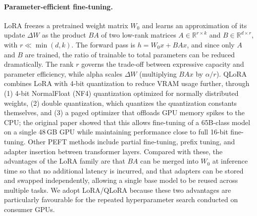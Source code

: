 \paragraph{Parameter-efficient fine-tuning.}
LoRA \citep{hu2022lora} freezes a pretrained weight matrix $W_0$ and learns an
approximation of its update $\Delta W$ as the product $BA$ of two low-rank
matrices $A \in \mathbb{R}^{r \times k}$ and $B \in \mathbb{R}^{d \times r}$, with
$r \ll \min(d,k)$. The forward pass is $h = W_0 x + BAx$, and since only $A$ and
$B$ are trained, the ratio of trainable to total parameters can be reduced
dramatically. The rank $r$ governs the trade-off between expressive capacity and
parameter efficiency, while alpha scales $\Delta W$ (multiplying $BAx$ by
$\alpha/r$). QLoRA \citep{dettmers2023qlora} combines LoRA with 4-bit
quantization to reduce VRAM usage further, through (1) 4-bit NormalFloat (NF4)
quantization optimized for normally distributed weights, (2) double quantization,
which quantizes the quantization constants themselves, and (3) a paged optimizer
that offloads GPU memory spikes to the CPU; the original paper showed that this
allows fine-tuning of a 65B-class model on a single 48\,GB GPU while maintaining
performance close to full 16-bit fine-tuning. Other PEFT methods include partial
fine-tuning, prefix tuning, and adapter insertion between transformer layers.
Compared with these, the advantages of the LoRA family are that $BA$ can be
merged into $W_0$ at inference time so that no additional latency is incurred,
and that adapters can be stored and swapped independently, allowing a single base
model to be reused across multiple tasks. We adopt LoRA/QLoRA because these two
advantages are particularly favourable for the repeated hyperparameter search
conducted on consumer GPUs.

